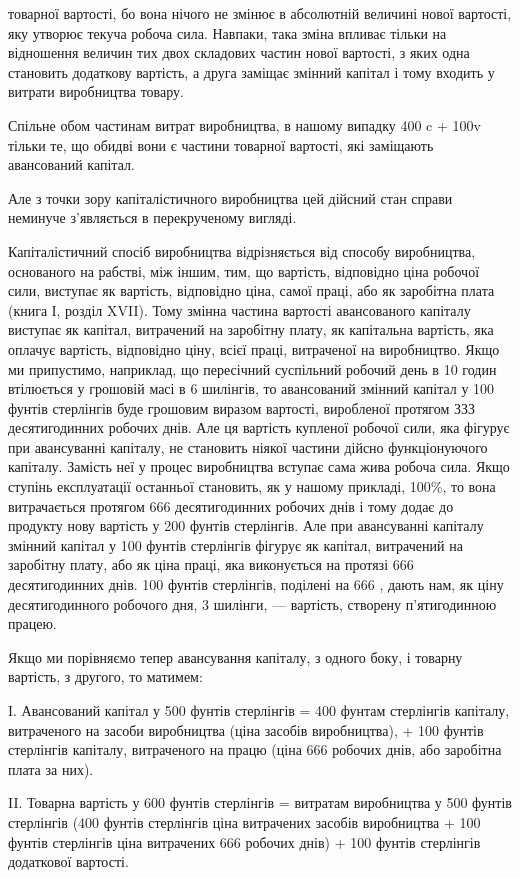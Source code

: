 \parcont{}  %
товарної вартості, бо вона нічого не змінює в абсолютній величині
нової вартості, яку утворює текуча робоча сила. Навпаки,
така зміна впливає тільки на відношення величин тих двох складових
частин нової вартості, з яких одна становить додаткову
вартість, а друга заміщає змінний капітал і тому входить у витрати
виробництва товару.

Спільне обом частинам витрат виробництва, в нашому випадку
400 c + 100v тільки те, що обидві вони є частини товарної
вартості, які заміщають авансований капітал.

Але з точки зору капіталістичного виробництва цей дійсний
стан справи неминуче з’являється в перекрученому вигляді.

Капіталістичний спосіб виробництва відрізняється від способу
виробництва, основаного на рабстві, між іншим, тим, що
вартість, відповідно ціна робочої сили, виступає як вартість,
відповідно ціна, самої праці, або як заробітна плата (книга І,
розділ XVII). Тому змінна частина вартості авансованого капіталу
виступає як капітал, витрачений на заробітну плату,
як капітальна вартість, яка оплачує вартість, відповідно ціну,
всієї праці, витраченої на виробництво. Якщо ми припустимо,
наприклад, що пересічний суспільний робочий день в 10 годин
втілюється у грошовій масі в 6 шилінгів, то авансований
змінний капітал у 100 фунтів стерлінгів буде грошовим
виразом вартості, виробленої протягом ЗЗЗ  десятигодинних
робочих днів. Але ця вартість купленої робочої сили, яка фігурує
при авансуванні капіталу, не становить ніякої частини
дійсно функціонуючого капіталу. Замість неї у процес виробництва
вступає сама жива робоча сила. Якщо ступінь експлуатації
останньої становить, як у нашому прикладі, 100\%, то вона
витрачається протягом 666 десятигодинних робочих днів і тому
додає до продукту нову вартість у 200 фунтів стерлінгів. Але
при авансуванні капіталу змінний капітал у 100 фунтів стерлінгів
фігурує як капітал, витрачений на заробітну плату, або як
ціна праці, яка виконується на протязі 666  десятигодинних
днів. 100 фунтів стерлінгів, поділені на 666 , дають нам, як
ціну десятигодинного робочого дня, 3 шилінги, — вартість, створену
п’ятигодинною працею.

Якщо ми порівняємо тепер авансування капіталу, з одного
боку, і товарну вартість, з другого, то матимем:

I. Авансований капітал у 500 фунтів стерлінгів = 400 фунтам
стерлінгів капіталу, витраченого на засоби виробництва
(ціна засобів виробництва), + 100 фунтів стерлінгів капіталу,
витраченого на працю (ціна 666  робочих днів, або заробітна
плата за них).

II. Товарна вартість у 600 фунтів стерлінгів = витратам виробництва
у 500 фунтів стерлінгів (400 фунтів стерлінгів
ціна витрачених засобів виробництва + 100 фунтів стерлінгів
ціна витрачених 666  робочих днів) + 100 фунтів
стерлінгів додаткової вартості.
